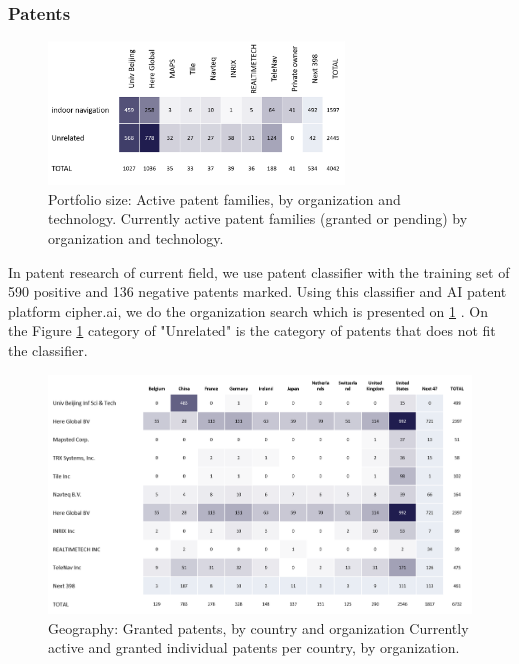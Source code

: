 \subsubsection{Patents}

\begin{figure}[ht]
	\centering
	\includegraphics[width=0.7\textwidth]{graphics/roadmap/patents/Patenting2.png}
	\caption{Portfolio size: Active patent families, by organization and technology. Currently active patent families (granted or pending) by organization and technology.}
	\label{fig:Patent-families2}
\end{figure}

In patent research of current field, we use patent classifier with the training set of 590 positive and 136 negative patents marked.
Using this classifier and AI patent platform cipher.ai, we do the organization search which is presented on \ref{fig:Patent-families2}
. On the Figure \ref{fig:Patent-families2} category of "Unrelated" is the category of patents that does not fit the classifier.


\begin{figure}[ht]
	\centering
	\includegraphics[width=\textwidth]{graphics/roadmap/patents/Geography Granted patents by country and organisation.png}
	\caption{Geography: Granted patents, by country and organization
		Currently active and granted individual patents per country, by organization.}
	\label{fig:Granted-patents-by-coutry}
\end{figure}

